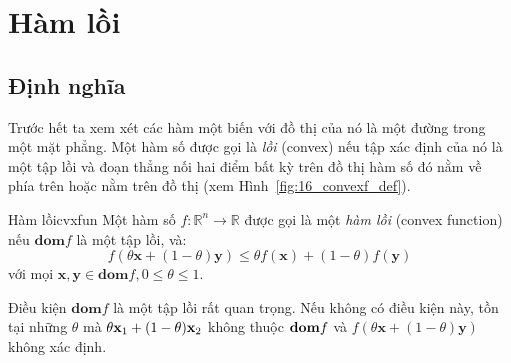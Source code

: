 \section{Hàm lồi}



\subsection{Định nghĩa}
Trước hết ta xem xét các hàm một biến với đồ thị của nó là một đường trong một
mặt phẳng. Một hàm số được gọi là \textit{lồi} (convex) nếu {tập xác định của nó
là một tập lồi} và đoạn thẳng nối hai điểm bất kỳ trên đồ thị hàm số đó nằm về phía trên hoặc nằm trên đồ thị (xem
Hình~\ref{fig:16_convexf_def}).
\begin{mydef}{Hàm lồi}{cvxfun}
Một hàm số $f: \mathbb{R}^n \rightarrow \mathbb{R} $ được gọi là một \textit{hàm lồi} (convex function) nếu $\textbf{dom} f$ là một {tập lồi}, và:
\begin{equation*}
f(\theta\mathbf{x} + (1 - \theta) \mathbf{y}) \leq \theta f(\mathbf{x}) + (1 - \theta)f(\mathbf{y})
\end{equation*}
với mọi $\mathbf{x, y} \in \textbf{dom}f, 0 \leq \theta \leq 1$.
\end{mydef}


Điều kiện $\textbf{dom} f$ là một {tập lồi} rất quan trọng. Nếu không
có điều kiện này, tồn tại những $\theta$ mà $\theta \mathbf{x}_1 + (1-\theta)\mathbf{x}_2$
không thuộc $\boldsymbol{\mathbf{dom}} f$ và $f(\theta\mathbf{x} + (1 -
\theta)
\mathbf{y}) $ không xác định.


